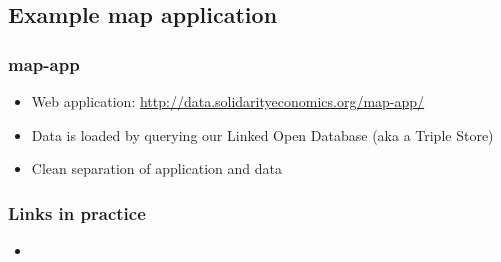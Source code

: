 \subsection{Example map application}
\frame
{
  \frametitle{map-app}
  \begin{itemize}
    \item Web application: \url{http://data.solidarityeconomics.org/map-app/}
    \item Data is loaded by querying our Linked Open Database (aka a Triple Store)
    \item Clean separation of application and data
  \end{itemize}
}
\frame
{
  \frametitle{Links in practice}
  \begin{center}
  \end{center}
  \begin{itemize}
    \item
  \end{itemize}
}


